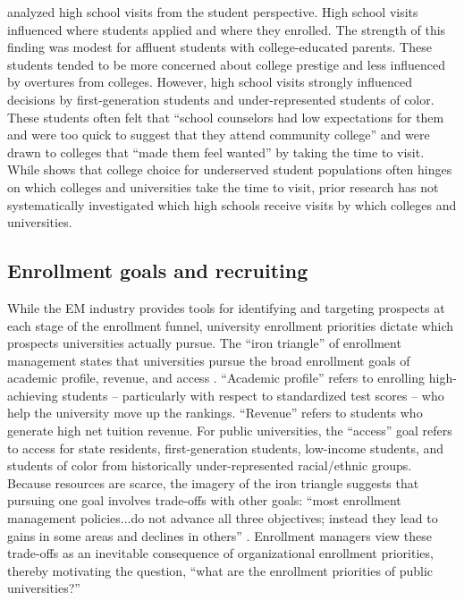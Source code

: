 \documentclass[twoside]{article}
\begin{document}
\cite{RN4324} analyzed high school visits from the student perspective. High school visits influenced where students applied and where they enrolled. The strength of this finding was modest for affluent students with college-educated parents. These students tended to be more concerned about college prestige and less influenced by overtures from colleges. However, high school visits strongly influenced decisions by  first-generation students and under-represented students of color.  These students often felt that ``school counselors had low expectations for them and were too quick to suggest that they attend community college'' and were drawn to colleges that ``made them feel wanted'' by taking the time to visit.  While \cite{RN4324} shows that college choice for underserved student populations often hinges on which colleges and universities take the time to visit, prior research has not systematically investigated which high schools receive visits by which colleges and universities.

\subsection*{Enrollment goals and recruiting}

While the EM industry provides tools for identifying and targeting prospects at each stage of the enrollment funnel, university enrollment priorities dictate which prospects universities actually pursue.  The ``iron triangle'' of enrollment management states that universities pursue the broad enrollment goals of academic profile, revenue, and access \citep{RN2772}. ``Academic profile'' refers to enrolling high-achieving students -- particularly with respect to standardized test scores -- who help the university move up the rankings. ``Revenue'' refers to students who generate high net tuition revenue.  For public universities, the ``access'' goal refers to access for state residents, first-generation students, low-income students, and students of color from historically under-represented racial/ethnic groups. Because resources are scarce, the imagery of the iron triangle suggests that pursuing one goal involves trade-offs with other goals: ``most enrollment management policies...do not advance all three objectives; instead they lead to gains in some areas and declines in others'' \citep[p.~221]{RN2772}. Enrollment managers view these trade-offs as an inevitable consequence of organizational enrollment priorities, thereby motivating the question, ``what are the enrollment priorities of public universities?''
\end{document}
